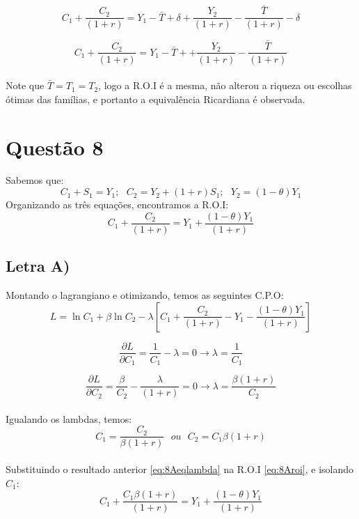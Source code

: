 \documentclass{article}
\begin{document}
\begin{equation}
    C_1 + \frac{C_2}{(1+r)} = Y_1 - \bar{T}+\delta + \frac{Y_2}{(1+r)}-\frac{\bar{T}}{(1+r)}-\delta
\end{equation}

\begin{equation}
    C_1 + \frac{C_2}{(1+r)} = Y_1 - \bar{T}+ + \frac{Y_2}{(1+r)}-\frac{\bar{T}}{(1+r)}
\end{equation}
\\
Note que $\bar{T}=T_1=T_2$, logo a R.O.I é a mesma, não alterou a riqueza ou escolhas ótimas das famílias, e portanto a equivalência Ricardiana é observada.
\clearpage
\section*{Questão 8}
Sabemos que:
$$C_1 + S_1 = Y_1; \>\>\> C_2 = Y_2 + (1+r)S_1; \>\>\> Y_2 = (1-\theta)Y_1$$
Organizando as três equações, encontramos a R.O.I:
\begin{equation}\label{eq:8Aroi}
    C_1+\frac{C_2}{(1+r)}=Y_1+\frac{(1-\theta)Y_1}{(1+r)}
\end{equation}

\subsection*{Letra A)}
Montando o lagrangiano e otimizando, temos as seguintes C.P.O:
\begin{equation}
    L=\ln C_1 + \beta\ln C_2-\lambda\left[C_1+\frac{C_2}{(1+r)}-Y_1-\frac{(1-\theta)Y_1}{(1+r)}\right]
\end{equation}

\begin{equation}
    \frac{\partial L}{\partial C_1} = \frac{1}{C_1} -\lambda=0 \to \lambda=\frac{1}{C_1}
\end{equation}

\begin{equation}
    \frac{\partial L}{\partial C_2}=\frac{\beta}{C_2}-\frac{\lambda}{(1+r)} =0 \to \lambda=\frac{\beta(1+r)}{C_2}
\end{equation}
\\
Igualando os lambdas, temos:
\begin{equation}\label{eq:8Aeqlambda}
    C_1=\frac{C_2}{\beta(1+r)} \>\>\> ou \>\>\> C_2=C_1\beta(1+r)
\end{equation}
\\
Substituindo o resultado anterior \eqref{eq:8Aeqlambda} na R.O.I \eqref{eq:8Aroi}, e isolando $C_1$:
\begin{equation}
    C_1+\frac{C_1\beta(1+r)}{(1+r)} = Y_1 + \frac{(1-\theta)Y_1}{(1+r)}
\end{equation}
\end{document}
